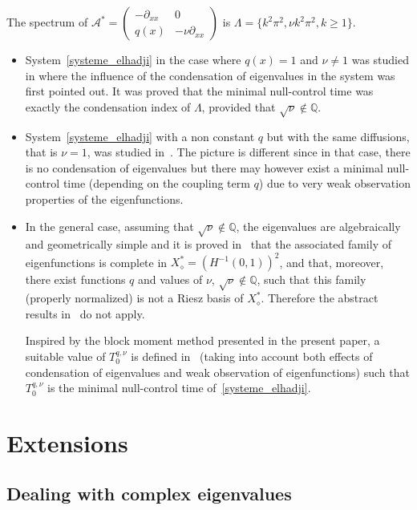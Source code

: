\documentclass[AHL,Unicode,longabstracts]{cedram}
\newcommand\As{\mathcal{A}^*}
\newcommand{\Xalphas}{X_\diamond^*}
\begin{document}
The spectrum of $\As=
\begin{pmatrix} -\partial_{xx} & 0 \\ q(x) & -\nu \partial_{xx}
\end{pmatrix}$ is $\Lambda = \{ k^2 \pi^2 , \nu k^2 \pi^2, k\geq 1 \}$.
\begin{itemize}
\item System~\eqref{systeme_elhadji} in the case where $q(x)=1$ and $\nu\neq 1$ was studied in\linebreak \cite{AmmarKhodjaBenabdallahGonzalez-BurgosdeTeresa:2014} where the influence of the condensation of eigenvalues in the system was first pointed out. It was proved that the minimal null-control time was exactly the condensation index of $\Lambda$, provided that $\sqrt{\nu}\not\in \mathbb Q$.
\item System~\eqref{systeme_elhadji} with a non constant $q$ but with the same diffusions, that is $\nu=1$, was studied in~\cite{AKBGBdT_JMAA16}. The picture is different since in that case, there is no condensation of eigenvalues but there may however exist a minimal null-control time (depending on the coupling term $q$) due to very weak observation properties of the eigenfunctions.
\item In the general case, assuming that $\sqrt{\nu}\not\in \mathbb Q$, the eigenvalues are algebraically and geometrically simple and it is proved in~\cite{Samb18} that the associated family of eigenfunctions is complete in $\Xalphas=(H^{-1}(0,1))^2$, and that, moreover, there exist functions $q$ and values of $\nu$, $\sqrt{\nu}\not\in \mathbb Q$, such that this family (properly normalized) is not a Riesz basis of $\Xalphas$. Therefore the abstract results in~\cite{AmmarKhodjaBenabdallahGonzalez-BurgosdeTeresa:2014,AKBGBdT_JMAA16} do not apply.

Inspired by the block moment method presented in the present paper, a suitable value of $T_0^{q,\nu}$ is defined in~\cite{Samb18} (taking into account both effects of condensation of eigenvalues and weak observation of eigenfunctions) such that $T_0^{q,\nu}$ is the minimal null-control time of~\eqref{systeme_elhadji}.
\end{itemize}



\section{Extensions} \label{Sec:Extensions}


\subsection{Dealing with complex eigenvalues} \label{Subsec:ValeurPropresComplexes}
\end{document}
